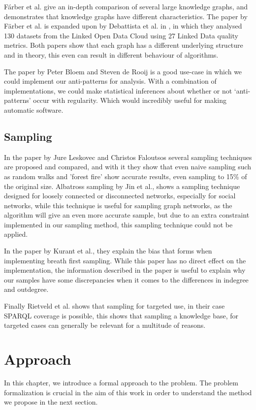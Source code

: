 \documentclass[11pt,letterpaper ,oneside ]{book}
\begin{document}
	F\'arber et al. \cite{MichaelF:2017} give an in-depth comparison of several large knowledge graphs, and demonstrates that knowledge graphs have different characteristics. The paper by F\"arber et al. \cite{MichaelF:2017} is expanded upon by Debattista et al. in \cite{Debattista:2018}, in which they analysed 130 datasets from the Linked Open Data Cloud using 27 Linked Data quality metrics. Both papers show that each graph has a different underlying structure and in theory, this even can result in different behaviour of algorithms.
	
	The paper by Peter Bloem and Steven de Rooij\cite{BloemP:2018} is a good use-case in which we could implement our anti-patterns for analysis. With a combination of implementations, we could make statistical inferences about whether or not `anti-patterns' occur with regularity. Which would incredibly useful for making automatic software.
	
	\section{Sampling}
	In the paper by Jure Leskovec and Christos Faloutsos \cite{Leskovec:2006} several sampling techniques are proposed and compared, and with it they show that even naive sampling such as random walks and 'forest fire' show accurate results, even sampling to 15\% of the original size. 
	Albatross sampling by Jin et al.\cite{Jin:2011}, shows a sampling technique designed for loosely connected or disconnected networks, especially for social networks, while this technique is useful for sampling graph networks, as the algorithm will give an even more accurate sample, but due to an extra constraint implemented in our sampling method, this sampling technique could not be applied.
	
	In the paper by Kurant et al.\cite{Kurant:2011}, they explain the bias that forms when implementing breath first sampling.
	While this paper has no direct effect on the implementation, the information described in the paper is useful to explain why our samples have some discrepancies when it comes to the differences in indegree and outdegree. 
	
	Finally Rietveld et al.\cite{Rietveld:2014} shows that sampling for targeted use, in their case SPARQL coverage is possible, this shows that sampling a knowledge base, for targeted cases can generally be relevant for a multitude of reasons.
	
	
	\newpage
	\chapter{Approach}\label{ProblemDefintion}
	In this chapter, we introduce a formal approach to the problem. The problem formalization is crucial in the aim of this work in order to understand the method we propose in the next section.
	
\end{document}
